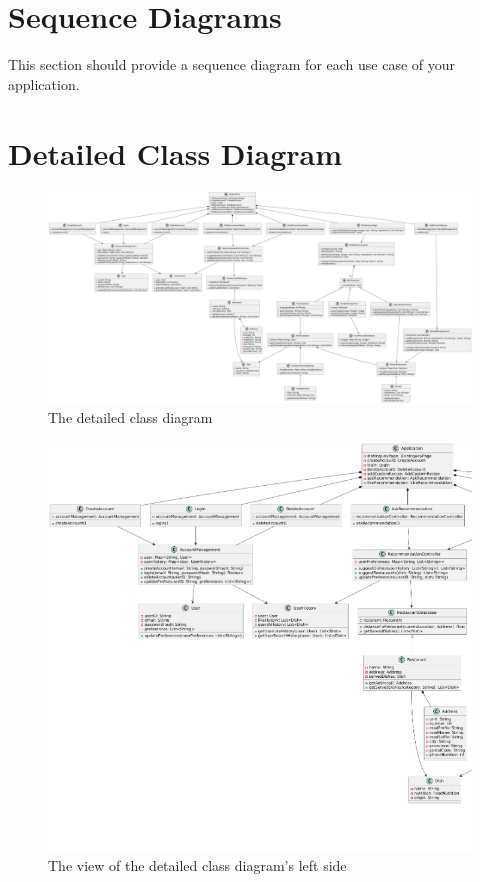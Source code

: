 \documentclass[]{article}
\begin{document}

\section{Sequence Diagrams}
\label{sec:sequence_diagrams}
This section should provide a sequence diagram for each use case of your application.

\section{Detailed Class Diagram}
\label{sec:detailed_class_diagram}
\begin{figure}[H]
	\centering
   \includegraphics[width=\textwidth]{image/detailedClassDiagram.png}
   \caption{The detailed class diagram}
\end{figure}

\begin{figure}[H]
	\centering
	\includegraphics[width=\textwidth]{image/classDiagLeft.png}
	\caption{The view of the detailed class diagram's left side}
\end{figure}
\end{document}
